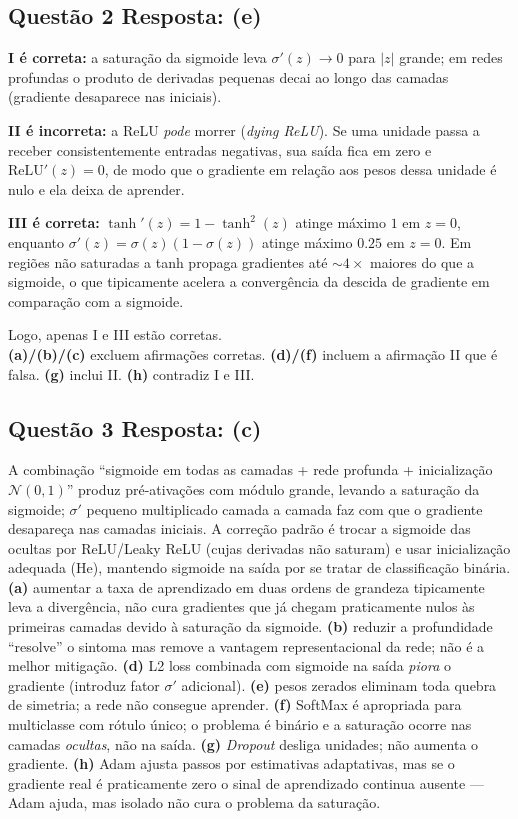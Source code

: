 \documentclass[11pt,a4paper]{article}
\begin{document}
\subsection*{Questão 2 \textemdash{} Resposta: (e)}
\textbf{I é correta:} a saturação da sigmoide leva $\sigma'(z) \to 0$ para $|z|$ grande; em redes profundas o produto de derivadas pequenas decai ao longo das camadas (gradiente desaparece nas iniciais).

\textbf{II é incorreta:} a ReLU \textit{pode} morrer (\textit{dying ReLU}). Se uma unidade passa a receber consistentemente entradas negativas, sua saída fica em zero e $\mathrm{ReLU}'(z) = 0$, de modo que o gradiente em relação aos pesos dessa unidade é nulo e ela deixa de aprender.

\textbf{III é correta:} $\tanh'(z) = 1 - \tanh^2(z)$ atinge máximo $1$ em $z = 0$, enquanto $\sigma'(z) = \sigma(z)(1 - \sigma(z))$ atinge máximo $0.25$ em $z = 0$. Em regiões não saturadas a tanh propaga gradientes até $\sim 4\times$ maiores do que a sigmoide, o que tipicamente acelera a convergência da descida de gradiente em comparação com a sigmoide.

Logo, apenas I e III estão corretas.\\
\textbf{(a)/(b)/(c)} excluem afirmações corretas.
\textbf{(d)/(f)} incluem a afirmação II que é falsa.
\textbf{(g)} inclui II.
\textbf{(h)} contradiz I e III.

\subsection*{Questão 3 \textemdash{} Resposta: (c)}
A combinação ``sigmoide em todas as camadas + rede profunda + inicialização $\mathcal{N}(0, 1)$'' produz pré-ativações com módulo grande, levando a saturação da sigmoide; $\sigma'$ pequeno multiplicado camada a camada faz com que o gradiente desapareça nas camadas iniciais. A correção padrão é trocar a sigmoide das ocultas por ReLU/Leaky ReLU (cujas derivadas não saturam) e usar inicialização adequada (He), mantendo sigmoide na saída por se tratar de classificação binária.\\
\textbf{(a)} aumentar a taxa de aprendizado em duas ordens de grandeza tipicamente leva a divergência, não cura gradientes que já chegam praticamente nulos às primeiras camadas devido à saturação da sigmoide.
\textbf{(b)} reduzir a profundidade ``resolve'' o sintoma mas remove a vantagem representacional da rede; não é a melhor mitigação.
\textbf{(d)} L2 loss combinada com sigmoide na saída \emph{piora} o gradiente (introduz fator $\sigma'$ adicional).
\textbf{(e)} pesos zerados eliminam toda quebra de simetria; a rede não consegue aprender.
\textbf{(f)} SoftMax é apropriada para multiclasse com rótulo único; o problema é binário e a saturação ocorre nas camadas \emph{ocultas}, não na saída.
\textbf{(g)} \textit{Dropout} desliga unidades; não aumenta o gradiente.
\textbf{(h)} Adam ajusta passos por estimativas adaptativas, mas se o gradiente real é praticamente zero o sinal de aprendizado continua ausente — Adam ajuda, mas isolado não cura o problema da saturação.
\end{document}
